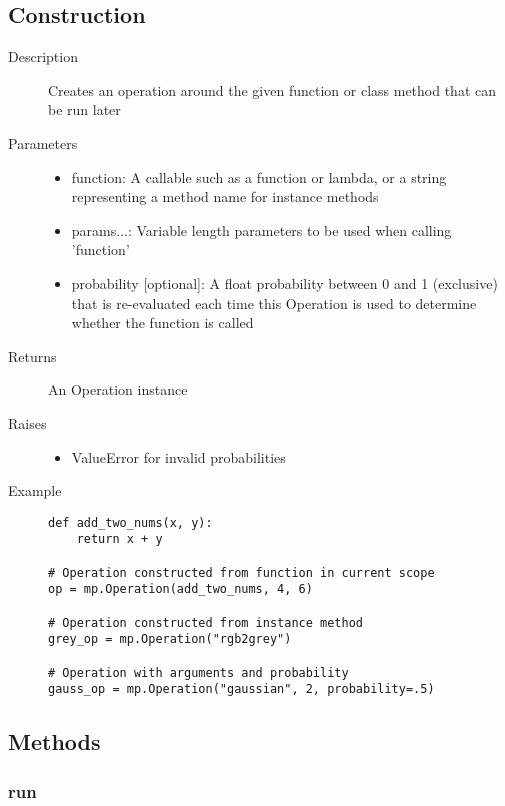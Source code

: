 \subsection{Construction}

\begin{description}
   \item[Description] Creates an operation around the given function or class method that can be run later
   \item[Parameters] \phantom{}
   \begin{itemize}
       \item function: A callable such as a function or lambda, or a string representing a method name for instance methods
       \item params...: Variable length parameters to be used when calling 'function'
       \item probability [optional]: A float probability between 0 and 1 (exclusive) that is re-evaluated each time this Operation is used to determine whether the function is called
   \end{itemize}
   \item[Returns] An Operation instance
   \item[Raises] \phantom{}
   \begin{itemize}
       \item ValueError for invalid probabilities
   \end{itemize}
   \item[Example] \phantom{}
   \begin{lstlisting}
def add_two_nums(x, y):
    return x + y

# Operation constructed from function in current scope
op = mp.Operation(add_two_nums, 4, 6)

# Operation constructed from instance method
grey_op = mp.Operation("rgb2grey")

# Operation with arguments and probability
gauss_op = mp.Operation("gaussian", 2, probability=.5)

\end{lstlisting}
\end{description}

\subsection{Methods}

\subsubsection{run}

